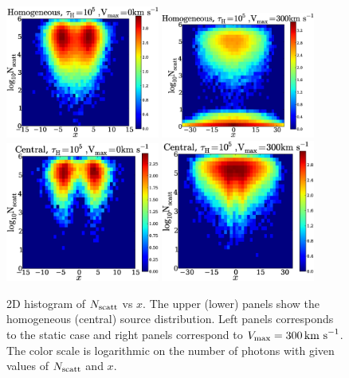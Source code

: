 \documentclass{emulateapj}
\newcommand{\kms}{{\ifmmode{{\mathrm{\,km\ s}^{-1}}}\else{\,km~s$^{-1}$}\fi}}
\begin{document}
\begin{figure}
\begin{center}
  \includegraphics[width=0.45\textwidth]{f5_1.eps}
  \includegraphics[width=0.45\textwidth]{f5_2.eps}
  \includegraphics[width=0.45\textwidth]{f5_3.eps}
  \includegraphics[width=0.45\textwidth]{f5_4.eps}    
\end{center}
    \caption{2D histogram of $N_{\rm scatt}$ vs $x$. The upper (lower) panels
      show the homogeneous (central) source distribution. Left panels 
      corresponds to the static case and right panels correspond to
      $V_{\rm max}=300\kms$. The color scale is logarithmic on the
      number of photons with given values of $N_{\rm scatt}$ and
      $x$. \label{fig:Nscatt2D}}   
\end{figure}
\end{document}
